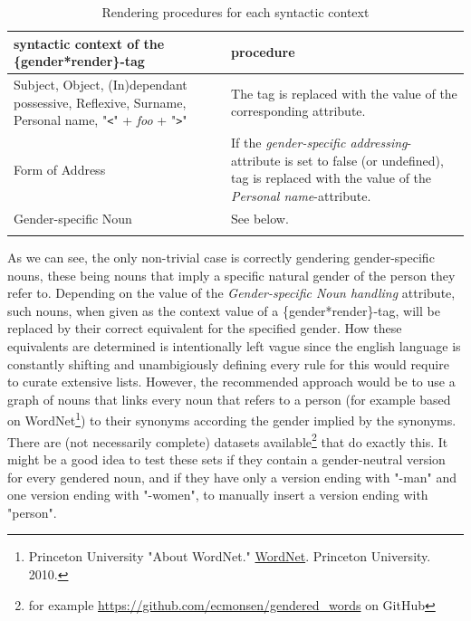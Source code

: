 \documentclass{article}
\begin{document}
    \begin{flushleft}
        \begin{center}
            \begin{longtable}{|>{\raggedright\arraybackslash}p{8em} | >{\raggedright\arraybackslash}p{28em} |}
                 \hline
                 syntactic context of the \{gender*render\}-tag & procedure\\
                 \hline
                 \hline
                 Subject, Object, (In)dependant possessive, Reflexive, Surname, Personal name, "\texttt{<}" + \emph{foo} + "\texttt{>}" & The tag is replaced with the value of the corresponding attribute. \\
                 \hline
                 Form of Address & If the \emph{gender-specific addressing}-attribute  is set to false (or undefined), tag is replaced with the value of the \emph{Personal name}-attribute.  \\
                 \hline
                 Gender-specific Noun & See below. \\
                 \hline
                \caption{Rendering procedures for each syntactic context}
            \end{longtable}
        \end{center}
    \end{flushleft}

    As we can see, the only non-trivial case is correctly gendering gender-specific nouns, these being nouns that imply a specific natural gender of the person they refer to.
    Depending on the value of the \emph{Gender-specific Noun handling} attribute, such nouns, when given as the context value of a \{gender*render\}-tag, will be replaced by their correct equivalent for the specified gender.
    How these equivalents are determined is intentionally left vague since the english language is constantly shifting and unambigiously defining every rule for this would require to curate extensive lists.
    However, the recommended approach would be to use a graph of nouns that links every noun that refers to a person (for example based on WordNet\footnote{Princeton University "About WordNet." \href{https://wordnet.princeton.edu/}{WordNet}. Princeton University. 2010.}) to their synonyms according the gender implied by the synonyms.
    There are (not necessarily complete) datasets available\footnote{for example \url{https://github.com/ecmonsen/gendered_words} on GitHub} that do exactly this.
    It might be a good idea to test these sets if they contain a gender-neutral version for every gendered noun, and if they have only a version ending with "-man" and one version ending with "-women", to manually insert a version ending with "person".\\
\end{document}
